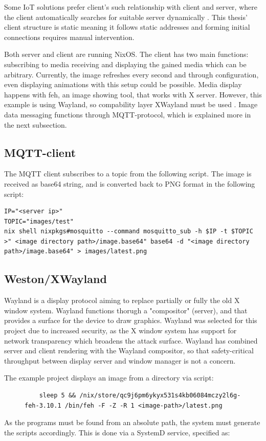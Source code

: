 Some IoT solutions prefer client's such relationship with client and
server, where the client automatically searches for suitable server
dynamically \cite{kandoi2021operating}. This thesis' client structure
is static meaning it follows static addresses and forming initial
connections requires manual intervention.

Both server and client are running NixOS. The client has two main
functions: subscribing to media receiving and displaying the gained
media which can be arbitrary. Currently, the image refreshes every
second and through configuration, even displaying animations with this
setup could be possible. Media display happens with feh, an image
showing tool, that works with X server. However, this example is using
Wayland, so compability layer XWayland must be used
\cite{waylandWayland}. Image data messaging functions through
MQTT-protocol, which is explained more in the next subsection.

\subsection{MQTT-client}
The MQTT client subscribes to a topic from the following script. The
image is received as base64 string, and is converted back to PNG
format in the following script:
\begin{lstlisting}
IP="<server ip>"
TOPIC="images/test"
nix shell nixpkgs#mosquitto --command mosquitto_sub -h $IP -t $TOPIC >" <image directory path>/image.base64" base64 -d "<image directory path>/image.base64" > images/latest.png
\end{lstlisting}
\subsection{Weston/XWayland}
Wayland is a display protocol aiming to replace partially or fully the
old X window system. Wayland functions thorugh a "compositor"
(server), and that provides a surface for the device to draw
graphics. Wayland was selected for this project due to increased
security, as the X window system has support for network transparency
which broadens the attack surface. Wayland has combined server and
client rendering with the Wayland compositor, so that safety-critical
throughput between display server and window manager is not a
concern. \cite{waylandWayland} %

The example project displays an image from a directory via script:
\begin{figure}[H]
\begin{lstlisting} 
    sleep 5 && /nix/store/qc9j6pm6ykyx531s4kb06084mczy2l6g-feh-3.10.1 /bin/feh -F -Z -R 1 <image-path>/latest.png
\end{lstlisting}
\label{fehscript}
\end{figure}
As the programs must be found from an absolute path, the system must
generate the scripts accordingly. This is done via a SystemD service,
specified as:

